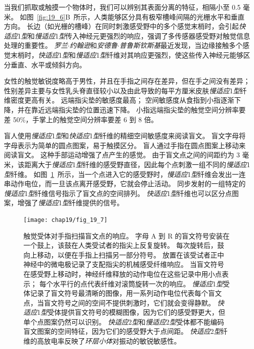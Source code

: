 当我们抓取或触摸一个物体时，我们可以辨别其表面分离的特征，相隔小至 0.5 毫米。
如图~\ref{fig:19_6}B~所示，人类能够区分具有极窄槽峰间隔的光栅水平和垂直方向。
长边（如光栅的槽峰）在同时刺激感受野中的多个感觉末梢时，会引起\textit{快适应}1\textit{型}和\textit{慢适应}1\textit{型}传入神经元更强烈的响应，强调了多传感器感受野对触觉信息处理的重要性。
\textit{罗兰$\cdot$约翰逊}和\textit{安德鲁$\cdot$普鲁斯钦斯基}最近发现，当边缘接触多个感觉末梢时，\textit{快适应}1\textit{型}和\textit{慢适应}1\textit{型}纤维对其响应更强烈，使这些传入神经元能够区分垂直、水平或倾斜方向。


女性的触觉敏锐度略高于男性，并且在手指之间存在差异，但在手之间没有差异；
性别差异主要与女性乳头脊直径较小以及由此导致的每平方厘米皮肤\textit{慢适应}1\textit{型}纤维密度更高有关。
远端指尖垫的敏感度最高；
空间敏感度从食指到小指逐渐下降，并在靠近远端指尖垫的位置迅速下降。
小指远端指尖垫的触觉空间分辨率要差 50\%，手掌上的触觉空间分辨率要差 6 到 8 倍。


盲人使用\textit{慢适应}1\textit{型}和\textit{快适应}1\textit{型}纤维的精细空间敏感度来阅读盲文。
盲文字母将字母表示为简单的圆点图案，易于触摸区分。
盲人通过手指在圆点图案上移动来阅读盲文。
这种手部运动增强了点产生的感觉。
由于盲文点之间的间距约为 3 毫米，该距离大于\textit{慢适应}1\textit{型}纤维的感受野直径，因此每个点刺激一组不同的\textit{慢适应}1\textit{型}纤维。
如图~\ref{fig:19_7}~所示，当一个点进入它的感受野时，\textit{慢适应}1\textit{型}纤维会发出一连串动作电位，而一旦该点离开感受野，它就会停止活动。
同步发射的一组特定的\textit{慢适应}1\textit{型}纤维信号指示了盲文点的空间排列。
\textit{快适应}1\textit{型}纤维也可以区分点图案，增强了\textit{慢适应}1\textit{型}纤维提供的信号。


\begin{figure}[htbp]
	\centering
	\texttt{[image: chap19/fig\_19\_7]}
	\caption{触觉受体对手指扫描盲文点的响应。
		字母 A 到 R 的盲文符号安装在一个鼓上，该鼓在人类受试者的指尖上反复旋转。
		每次旋转后，鼓向上移动，以便在手指上扫描另一部分符号。
		放置在该受试者正中神经中的微电极记录了支配指尖的机械感受纤维响应。
		当盲文符号在感受野上移动时，神经纤维释放的动作电位在这些记录中用小点表示；
		每个水平行的点代表纤维对滚筒旋转一次的响应。
		\textit{慢适应}1\textit{型}受体记录了盲文符号最清晰的图像，用一系列动作电位代表每个盲文点，当盲文符号之间的空间不提供刺激时，它们就会变得静默。
		\textit{快适应}1\textit{型}受体提供盲文符号的模糊图像，因为它们的感受野更大，但单个点图案仍然可以识别。
		\textit{快适应}2\textit{型}和\textit{慢适应}2\textit{型}受体都不能编码盲文图案的空间特征，因为它们的感受野大于点间距。
		\textit{快适应}2\textit{型}纤维的高放电率反映了\textit{环层小体}对振动的敏锐敏感性\cite{phillips1990representation}。}
	\label{fig:19_7}
\end{figure}


